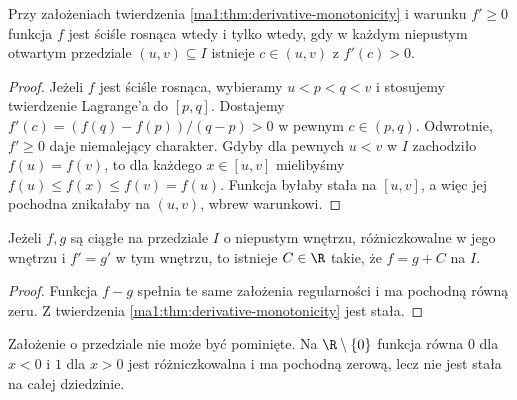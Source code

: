 \begin{wniosek}
\label{ma1:cor:strict-monotone-nonflat}
Przy założeniach twierdzenia \ref{ma1:thm:derivative-monotonicity} i warunku $f'\ge0$ funkcja $f$ jest ściśle rosnąca wtedy i tylko wtedy, gdy w każdym niepustym otwartym przedziale $(u,v)\subseteq I$ istnieje $c\in(u,v)$ z $f'(c)>0$.
\end{wniosek}
\begin{proof}
Jeżeli $f$ jest ściśle rosnąca, wybieramy $u<p<q<v$ i stosujemy twierdzenie Lagrange'a do $[p,q]$. Dostajemy $f'(c)=(f(q)-f(p))/(q-p)>0$ w pewnym $c\in(p,q)$. Odwrotnie, $f'\ge0$ daje niemalejący charakter. Gdyby dla pewnych $u<v$ w $I$ zachodziło $f(u)=f(v)$, to dla każdego $x\in[u,v]$ mielibyśmy $f(u)\le f(x)\le f(v)=f(u)$. Funkcja byłaby stała na $[u,v]$, a więc jej pochodna znikałaby na $(u,v)$, wbrew warunkowi.
\end{proof}
\begin{wniosek}
\label{ma1:cor:equal-derivatives}
Jeżeli $f,g$ są ciągłe na przedziale $I$ o niepustym wnętrzu, różniczkowalne w jego wnętrzu i $f'=g'$ w tym wnętrzu, to istnieje $C\in\R$ takie, że $f=g+C$ na $I$.
\end{wniosek}
\begin{proof}
Funkcja $f-g$ spełnia te same założenia regularności i ma pochodną równą zeru. Z twierdzenia \ref{ma1:thm:derivative-monotonicity} jest stała.
\end{proof}
Założenie o przedziale nie może być pominięte. Na $\R\setminus\{0\}$ funkcja równa $0$ dla $x<0$ i $1$ dla $x>0$ jest różniczkowalna i ma pochodną zerową, lecz nie jest stała na całej dziedzinie.

